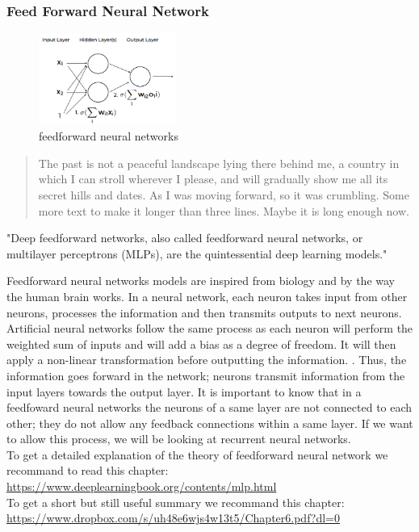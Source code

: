 \documentclass[6pt,letter]{article}\usepackage[]{graphicx}\usepackage[]{color}
\newcommand{\ntodo}[2][]{\todo[#1]{\thesubsubsection{}. #2}}
\begin{document}
\subsubsection{Feed Forward Neural Network}
\begin{figure}
  \begin{center}
    \includegraphics[width=0.4\textwidth]{feedforward_neural_networks.png}
  \end{center}
  \caption{feedforward neural networks}
  \label{fig:attention}
\end{figure}
\blockquote{The past is not a peaceful landscape lying there behind me, 
a country in which I can stroll wherever I please, 
and will gradually show me all its secret hills and dates. 
As I was moving forward, so it was crumbling. 
Some more text to make it longer than three lines. 
Maybe it is long enough now.}

"Deep feedforward networks, also called feedforward neural networks, or multilayer perceptrons (MLPs), are the quintessential deep learning models." \cite{Goodfellow-et-al-2016}

Feedforward neural networks models are inspired from biology and by the way the human brain works. In a neural network, each neuron takes input from other neurons, processes the information and then transmits outputs to next neurons. Artificial neural networks follow the same process as each neuron will perform the weighted sum of inputs and will add a bias as a degree of freedom. It will then apply a non-linear transformation before outputting the information. \ntodo[inline]{ajouter formule mathematique du neurone}. Thus, the information goes forward in the network; neurons transmit information from the input layers towards the output layer. It is important to know that in a feedfoward neural networks the neurons of a same layer are not connected to each other; they do not allow any feedback connections within a same layer. If we want to allow this process, we will be looking at recurrent neural networks.\\
To get a detailed explanation of the theory of feedforward neural network we recommand to read this chapter: \url{https://www.deeplearningbook.org/contents/mlp.html}\\
To get a short but still useful summary we recommand this chapter: \url{https://www.dropbox.com/s/uh48e6wjs4w13t5/Chapter6.pdf?dl=0}
\end{document}
